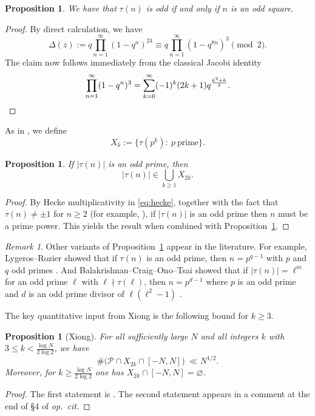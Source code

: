 \documentclass[12pt]{amsart}
\newtheorem{proposition}[theorem]{Proposition}
\theoremstyle{remark}
\newtheorem{remark}[theorem]{Remark}
\numberwithin{equation}{section}
\begin{document}
\begin{proposition}\label{prop:parity}
  We have that $\tau(n)$ is odd if and only if $n$ is an odd square.
\end{proposition}
\begin{proof}
By direct calculation, we have
\[ \Delta(z):=q\prod_{n=1}^{\infty} (1-q^n)^{24}\equiv q\prod_{n=1}^{\infty} (1-q^{8n})^3\pmod 2. \]
The claim now follows immediately from the classical Jacobi identity
\[ \prod_{n=1}^{\infty} (1-q^n)^3 =\sum_{k=0}^{\infty} (-1)^k (2k+1)q^{\frac{k^2+k}{2}}. \qedhere \]
\end{proof}
As in \cite[\S2]{Xiong2025}, we define
\[ X_k:=\{\tau(p^k):\ p\ \text{prime}\}. \]
\begin{proposition}
 \label{prop:X2k}
  If $|\tau(n)|$ is an odd prime, then
  \[ |\tau(n)| \in \bigcup_{k \ge 1} X_{2k}. \]
\end{proposition}
\begin{proof}
By Hecke multiplicativity in \eqref{eq:hecke}, together with the fact that $\tau(n)\neq \pm 1$ for $n\ge 2$
(for example, \cite[Thm.~1.1]{BalakrishnanCraigOno2022}),
if $|\tau(n)|$ is an odd prime then $n$ must be a prime power.
This yields the result when combined with Proposition~\ref{prop:parity}.
\end{proof}
\begin{remark}
  Other variants of Proposition~\ref{prop:X2k} appear in the literature.
  For example, Lygeros--Rozier showed that if $\tau(n)$ is an odd prime,
  then $n=p^{q-1}$ with $p$ and $q$ odd primes \cite{LygerosRozier2013}.
  And Balakrishnan--Craig--Ono--Tsai showed that
  if $|\tau(n)| = \ell^m$ for an odd prime $\ell$ with $\ell \nmid \tau(\ell)$,
  then $n = p^{d-1}$ where $p$ is an odd prime and $d$ is an odd prime divisor of $\ell(\ell^2-1)$
  \cite[Thm.~1.1]{BCOT2023}.
\end{remark}

The key quantitative input from Xiong is the following bound for $k\ge 3$.
\begin{proposition}[Xiong]\label{prop:xiong}
For all sufficiently large $N$ and all integers
$k$ with $3\le k<\frac{\log N}{2\log 2}$, we have
\[
  \#\bigl(\mathcal P\cap X_{2k}\cap[-N,N]\bigr)\ \ll N^{1/2}.
\]
Moreover, for $k\ge \frac{\log N}{2\log 2}$ one has $X_{2k}\cap[-N,N]=\varnothing$.
\end{proposition}
\begin{proof}
  The first statement is \cite[Prop.~5.4]{Xiong2025}.
  The second statement appears in a comment at the end of \S4 of \emph{op.\ cit.}
\end{proof}
\end{document}

